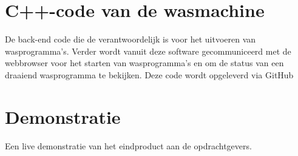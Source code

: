 \section{C++-code van de wasmachine}
De back-end code die de verantwoordelijk is voor het uitvoeren van wasprogramma's. Verder wordt vanuit deze software gecommuniceerd met de webbrowser voor het starten van wasprogramma's en om de status van een draaiend wasprogramma te bekijken. Deze code wordt opgeleverd via GitHub

\section{Demonstratie}
Een live demonstratie van het eindproduct aan de opdrachtgevers. 